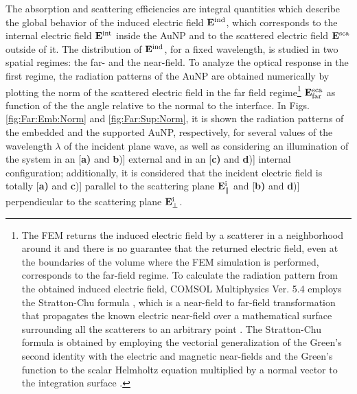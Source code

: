 The absorption and scattering efficiencies are integral quantities which describe the global behavior of the induced electric field $\vb{E}^\text{ind}$, which corresponds to the internal electric field $\vb{E}^\text{int}$ inside the AuNP and to the scattered electric field $\vb{E}^\text{sca}$ outside of it. The distribution of $\vb{E}^\text{ind}$, for a fixed wavelength, is studied in two spatial regimes: the far- and the near-field. To analyze the optical response in the first regime, the radiation patterns of the AuNP are obtained numerically by plotting the norm of the scattered electric field in the far field regime\footnote{%
    The FEM returns the induced electric field by a scatterer in a neighborhood around it  and there is no guarantee that the returned electric field, even at the boundaries of the volume where the FEM simulation is performed, corresponds to the far-field regime.  To calculate the radiation pattern from the obtained induced electric field, COMSOL Multiphysics\texttrademark{} Ver. 5.4  employs the  Stratton-Chu formula \cite{comsol_wave}, which is a near-field to far-field  transformation that  propagates the known electric near-field  over a mathematical surface surrounding all the scatterers  to an arbitrary point \cite{anyutin_algorithm_2019}. The Stratton-Chu formula is obtained by employing the vectorial generalization of the Green's second identity with the electric and magnetic near-fields and the Green's function to the scalar Helmholtz equation multiplied by a normal vector to the integration surface \cite{stratton_diffraction_1939}.%
    } %
 $\vb{E}^\text{sca}_\text{far}$ as function of the the angle relative to the normal to the interface. In Figs. \ref{fig:Far:Emb:Norm} and  \ref{fig:Far:Sup:Norm}, it is shown the radiation patterns of the embedded and the supported AuNP, respectively, for several values of the wavelength $\lambda$ of the incident plane wave, as well as considering an illumination of the system in an  [\textbf{a)} and \textbf{b})] external and in an  [\textbf{c)} and \textbf{d})] internal configuration; additionally, it is considered that the incident electric field is totally [\textbf{a)} and \textbf{c})] parallel to the scattering plane $\vb{E}^\text{i}_\parallel$ and [\textbf{b)} and \textbf{d})] perpendicular to the scattering plane $\vb{E}^\text{i}_\perp$.

